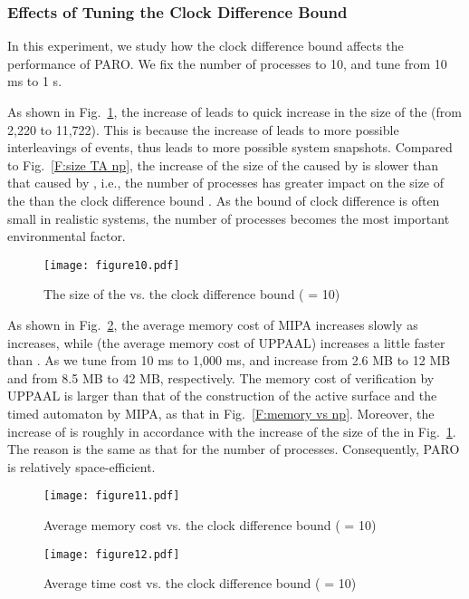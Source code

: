\documentclass[10pt,conference,compsocconf,letterpaper]{IEEEtran}
\begin{document}
\subsubsection{Effects of Tuning the Clock Difference Bound}

In this experiment, we study how the clock difference bound  affects the performance of \textsf{PARO}. We fix the number of processes  to 10, and tune  from 10 ms to 1 s.

As shown in Fig.~\ref{F:size TA e}, the increase of  leads to quick increase in the size of the  (from 2,220 to 11,722). This is because the increase of  leads to more possible interleavings of events, thus leads to more possible system snapshots. Compared to Fig.~\ref{F:size TA np}, the increase of the size of the  caused by  is slower than that caused by , i.e., the number of processes  has greater impact on the size of the  than the clock difference bound . As the bound of clock difference is often small in realistic systems, the number of processes  becomes the most important environmental factor.
\begin{figure}[tbp]
\begin{center}
  \texttt{[image: figure10.pdf]}
  \caption{The size of the  vs. the clock difference bound  ( = 10)}
  \label{F:size TA e}
\end{center}
\end{figure}

As shown in Fig.~\ref{F:memory vs e}, the average memory cost of MIPA  increases slowly as  increases, while  (the average memory cost of UPPAAL) increases a little faster than . As we tune  from 10 ms to 1,000 ms,  and  increase from 2.6 MB to 12 MB and from 8.5 MB to 42 MB, respectively. The memory cost of verification by UPPAAL is larger than that of the construction of the active surface and the timed automaton by MIPA, as that in Fig.~\ref{F:memory vs np}. Moreover, the increase of  is roughly in accordance with the increase of the size of the  in Fig.~\ref{F:size TA e}. The reason is the same as that for the number of processes. Consequently, \textsf{PARO} is relatively space-efficient.
\begin{figure}[tbp]
\begin{center}
  \texttt{[image: figure11.pdf]}
  \caption{Average memory cost vs. the clock difference bound  ( = 10)}
  \label{F:memory vs e}
\end{center}
\end{figure}
\begin{figure}[tbp]
\begin{center}
  \texttt{[image: figure12.pdf]}
  \caption{Average time cost vs. the clock difference bound  ( = 10)}
  \label{F:time vs e}
\end{center}
\end{figure}
\end{document}
